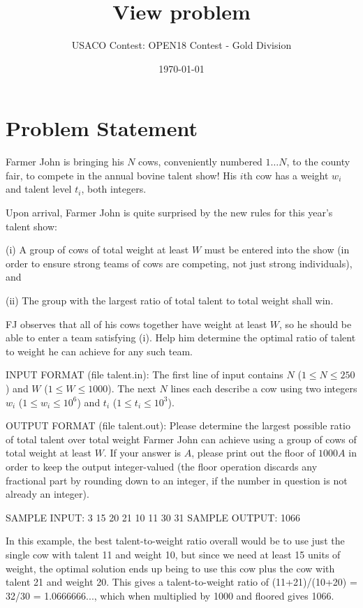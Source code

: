 \documentclass[12pt]{article}
\title{View problem}
\author{USACO Contest: OPEN18 Contest - Gold Division}
\date{\today}
\begin{document}
\maketitle

\section*{Problem Statement}

Farmer John is bringing his $N$ cows, conveniently numbered $1 \ldots N$, to the
county fair, to compete in the annual bovine talent show!  His $i$th cow has a
weight $w_i$ and talent level $t_i$, both integers.

Upon arrival, Farmer John is quite surprised by the new rules for this year's 
talent show:

(i) A group of cows of total weight at least $W$ must be entered into the show
(in order to ensure strong teams of cows are competing, not just strong 
individuals), and

(ii) The group with the largest ratio of total talent to total weight shall win.

FJ observes that all of his cows together have weight at least $W$, so he should
be able to enter a team satisfying (i).  Help him determine the optimal ratio of
talent to weight he can achieve for any such team.

INPUT FORMAT (file talent.in):
The first line of input contains $N$ ($1 \leq N \leq 250$) and $W$
($1 \leq W \leq 1000$). The next $N$ lines each describe a cow using two
integers $w_i$ ($1 \leq w_i \leq 10^6$) and $t_i$ ($1 \leq t_i \leq 10^3$).

OUTPUT FORMAT (file talent.out):
Please determine the largest possible ratio of total talent over total weight
Farmer John can achieve using a group of cows of total weight at least $W$.  If
your answer is $A$, please print out the floor of $1000A$ in order to keep the
output integer-valued (the floor operation discards any fractional part by
rounding down to an integer, if the number in question is not already an
integer).

SAMPLE INPUT:
3 15
20 21
10 11
30 31
SAMPLE OUTPUT: 
1066

In this example, the best talent-to-weight ratio overall would be to use just
the single cow with talent 11 and weight 10, but since we need at least  15
units of weight, the optimal solution ends up being to use this cow plus the cow
with talent 21 and weight 20.  This gives a talent-to-weight ratio of
(11+21)/(10+20) = 32/30 = 1.0666666..., which when multiplied by 1000 and
floored gives 1066.
\end{document}
